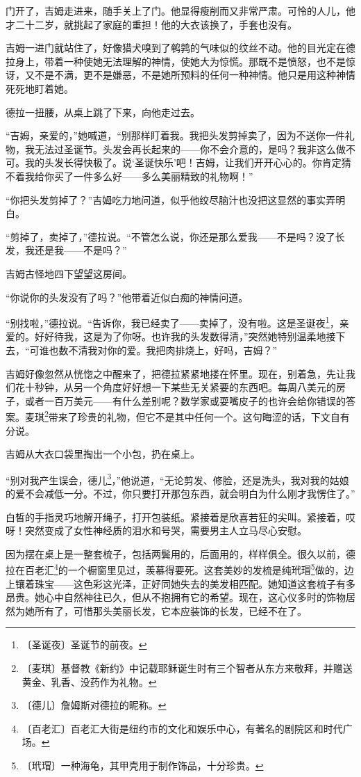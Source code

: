 \documentclass[12pt,UTF-8,openany]{ctexbook}
\begin{document}
\begin{normalsize}
    门开了，吉姆走进来，随手关上了门。他显得瘦削而又非常严肃。可怜的人儿，他才二十二岁，就挑起了家庭的重担！他的大衣该换了，手套也没有。
    
    吉姆一进门就站住了，好像猎犬嗅到了鹌鹑的气味似的纹丝不动。他的目光定在德拉身上，带着一种使她无法理解的神情，使她大为惊慌。那既不是愤怒，也不是惊讶，又不是不满，更不是嫌恶，不是她所预料的任何一种神情。他只是用这种神情死死地盯着她。
    
    德拉一扭腰，从桌上跳了下来，向他走过去。
    
    “吉姆，亲爱的，”她喊道，“别那样盯着我。我把头发剪掉卖了，因为不送你一件礼物，我无法过圣诞节。头发会再长起来的——你不会介意的，是吗？我非这么做不可。我的头发长得快极了。说‘圣诞快乐’吧！吉姆，让我们开开心心的。你肯定猜不着我给你买了一件多么好——多么美丽精致的礼物啊！”
    
    “你把头发剪掉了？”吉姆吃力地问道，似乎他绞尽脑汁也没把这显然的事实弄明白。
    
    “剪掉了，卖掉了，”德拉说。“不管怎么说，你还是那么爱我——不是吗？没了长发，我还是我——不是吗？”
    
    吉姆古怪地四下望望这房间。
    
    “你说你的头发没有了吗？”他带着近似白痴的神情问道。
    
    “别找啦，”德拉说。“告诉你，我已经卖了——卖掉了，没有啦。这是圣诞夜\footnote{〔圣诞夜〕圣诞节的前夜。}，亲爱的。好好待我，这是为了你呀。也许我的头发数得清，”突然她特别温柔地接下去，“可谁也数不清我对你的爱。我把肉排烧上，好吗，吉姆？”
    
    吉姆好像忽然从恍惚之中醒来了，把德拉紧紧地搂在怀里。现在，别着急，先让我们花十秒钟，从另一个角度好好想一下某些无关紧要的东西吧。每周八美元的房子，或者一百万美元——有什么差别呢？数学家或耍嘴皮子的也许会给你错误的答案。麦琪\footnote{〔麦琪〕基督教《新约》中记载耶稣诞生时有三个智者从东方来敬拜，并赠送黄金、乳香、没药作为礼物。}带来了珍贵的礼物，但它不是其中任何一个。这句晦涩的话，下文自有分说。
    
    吉姆从大衣口袋里掏出一个小包，扔在桌上。
    
    “别对我产生误会，德儿\footnote{〔德儿〕詹姆斯对德拉的昵称。}，”他说道，“无论剪发、修脸，还是洗头，我对我的姑娘的爱不会减低一分。不过，你只要打开那包东西，就会明白为什么刚才我愣住了。”
    
    白皙的手指灵巧地解开绳子，打开包装纸。紧接着是欣喜若狂的尖叫。紧接着，哎呀！突然变成了女性神经质的泪水和号哭，需要男主人立马尽心安慰。
    
    因为摆在桌上是一整套梳子，包括两鬓用的，后面用的，样样俱全。很久以前，德拉在百老汇\footnote{〔百老汇〕百老汇大街是纽约市的文化和娱乐中心，有著名的剧院区和时代广场。}的一个橱窗里见过，羡慕得要死。这套美妙的发梳是纯玳瑁\footnote{〔玳瑁〕一种海龟，其甲壳用于制作饰品，十分珍贵。}做的，边上镶着珠宝——这色彩这光泽，正好同她失去的美发相匹配。她知道这套梳子有多昂贵。她心中自然神往已久，但从不抱拥有它的希望。现在，这心仪多时的饰物居然为她所有了，可惜那头美丽长发，它本应装饰的长发，已经不在了。
    

\end{normalsize}
\end{document}
